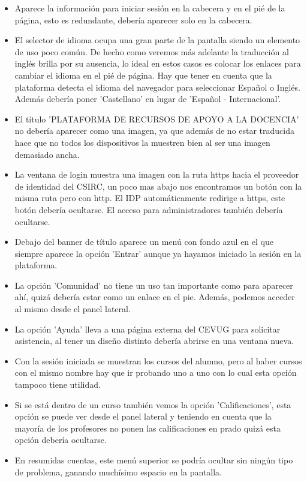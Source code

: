 \begin{itemize}

\item Aparece la información para iniciar sesión en la cabecera y en el pié de la página, esto es redundante, debería aparecer solo en la cabecera.
\item El selector de idioma ocupa una gran parte de la pantalla siendo un elemento de uso poco común. De hecho como veremos más adelante la traducción al inglés brilla por su ausencia, lo ideal en estos casos es colocar los enlaces para cambiar el idioma en el pié de página. Hay que tener en cuenta que la plataforma detecta el idioma del navegador para seleccionar Español o Inglés. Además debería poner 'Castellano' en lugar de 'Español - Internacional'.
\item El título 'PLATAFORMA DE RECURSOS DE APOYO A LA DOCENCIA' no debería aparecer como una imagen, ya que además de no estar traducida hace que no todos los dispositivos la muestren bien al ser una imagen demasiado ancha.
\item La ventana de login muestra una imagen con la ruta https hacia el proveedor de identidad del CSIRC, un poco mas abajo nos encontramos un botón con la misma ruta pero con http. El IDP automáticamente redirige a https, este botón debería ocultarse. El acceso para administradores también debería ocultarse.
\item Debajo del banner de título aparece un menú con fondo azul en el que siempre aparece la opción 'Entrar' aunque ya hayamos iniciado la sesión en la plataforma.
\item La opción 'Comunidad' no tiene un uso tan importante como para aparecer ahí, quizá debería estar como un enlace en el pie. Además, podemos acceder al mismo desde el panel lateral.
\item La opción 'Ayuda' lleva a una página externa del CEVUG para solicitar asistencia, al tener un diseño distinto debería abrirse en una ventana nueva.
\item Con la sesión iniciada se muestran los cursos del alumno, pero al haber cursos con el mismo nombre hay que ir probando uno a uno con lo cual esta opción tampoco tiene utilidad.
\item Si se está dentro de un curso también vemos la opción 'Calificaciones', esta opción se puede ver desde el panel lateral y teniendo en cuenta que la mayoría de los profesores no ponen las calificaciones en prado quizá esta opción debería ocultarse.
\item En resumidas cuentas, este menú superior se podría ocultar sin ningún tipo de problema, ganando muchísimo espacio en la pantalla.

\end{itemize}
